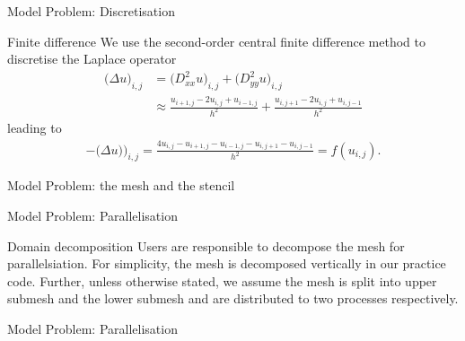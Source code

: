 \documentclass[xcolor=dvipsnames]{beamer}
\begin{document}
\begin{frame}{Model Problem: Discretisation}
\begin{block}{Finite difference}
We use the second-order central finite difference method to discretise the Laplace operator
 \begin{align*}
     \big(\Delta u\big)_{i,j} & = \big(D_{xx}^2u\big)_{i,j}+ \big(D_{yy}^2 u\big)_{i,j}\\[2ex]
     & \approx \frac{u_{i+1,j}-2u_{i,j}+u_{i-1,j}}{h^2} + \frac{u_{i,j+1}-2u_{i,j}+u_{i,j-1}}{h^2} 
 \end{align*}
leading to
\begin{align*}
    -\big(\Delta u)\big)_{i,j} = \frac{4u_{i,j}-u_{i+1,j}-u_{i-1,j}-u_{i,j+1}-u_{i,j-1}}{h^2}=f(u_{i,j}).
\end{align*}
\end{block}
\end{frame}


\begin{frame}{Model Problem: the mesh and the stencil}

\end{frame}

\begin{frame}{Model Problem: Parallelisation}
\begin{block}{Domain decomposition}
Users are responsible to decompose the mesh for parallelsiation. For simplicity, the mesh is decomposed vertically in our practice code. Further,  unless otherwise stated,  we assume the mesh is split into upper submesh and the lower submesh and are distributed to two processes respectively.
\end{block}
\end{frame}

\begin{frame}{Model Problem: Parallelisation}
\end{frame}
\end{document}
